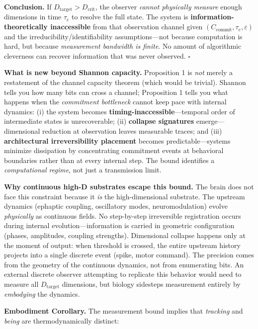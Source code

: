 \documentclass[12pt]{article}
\begin{document}
\textbf{Conclusion.} If $D_{\text{target}} > D_{\text{crit}}$, the observer \textit{cannot physically measure} enough dimensions in time $\tau_e$ to resolve the full state. The system is \textbf{information-theoretically inaccessible} from that observation channel given $(C_{\text{commit}}, \tau_e, \varepsilon)$ and the irreducibility/identifiability assumptions---not because computation is hard, but because \textit{measurement bandwidth is finite}. No amount of algorithmic cleverness can recover information that was never observed. $\square$

\textbf{What is new beyond Shannon capacity.} Proposition 1 is \textit{not} merely a restatement of the channel capacity theorem (which would be trivial). Shannon tells you how many bits can cross a channel; Proposition 1 tells you what happens when the \textit{commitment bottleneck} cannot keep pace with internal dynamics: (i) the system becomes \textbf{timing-inaccessible}---temporal order of intermediate states is unrecoverable; (ii) \textbf{collapse signatures} emerge---dimensional reduction at observation leaves measurable traces; and (iii) \textbf{architectural irreversibility placement} becomes predictable---systems minimize dissipation by concentrating commitment events at behavioral boundaries rather than at every internal step. The bound identifies a \textit{computational regime}, not just a transmission limit.

\textbf{Why continuous high-D substrates escape this bound.} The brain does not face this constraint because it \textit{is} the high-dimensional substrate. The upstream dynamics (ephaptic coupling, oscillatory modes, neuromodulation) evolve \textit{physically} as continuous fields. No step-by-step irreversible registration occurs during internal evolution---information is carried in geometric configuration (phases, amplitudes, coupling strengths). Dimensional collapse happens only at the moment of output: when threshold is crossed, the entire upstream history projects into a single discrete event (spike, motor command). The precision comes from the geometry of the continuous dynamics, not from enumerating bits. An external discrete observer attempting to replicate this behavior would need to measure all $D_{\text{target}}$ dimensions, but biology sidesteps measurement entirely by \textit{embodying} the dynamics.

\textbf{Embodiment Corollary.} The measurement bound implies that \textit{tracking} and \textit{being} are thermodynamically distinct:
\end{document}
